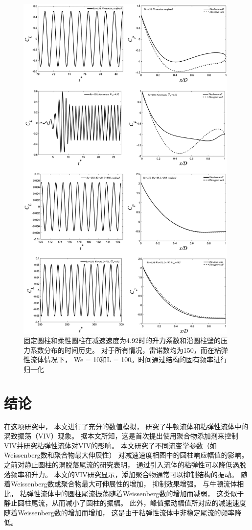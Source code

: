 \documentclass[UTF8,zihao=5]{ctexart} %
\begin{document}
\begin{figure}[htbp]
    \centering
    \includegraphics[width=11cm]{fig18.jpg}
    \caption{
        固定圆柱和柔性圆柱在减速速度为4.92时的升力系数和沿圆柱壁的压力系数分布的时间历史。
        对于所有情况，雷诺数均为150，而在粘弹性流体情况下，
        We = 10和L = 100。时间通过结构的固有频率进行归一化
    }
    \label{fig:18}
\end{figure}

\section{结论}

在这项研究中，
本文进行了充分的数值模拟，
研究了牛顿流体和粘弹性流体中的涡致振荡（VIV）现象。
据本文所知，这是首次提出使用聚合物添加剂来控制VIV并研究粘弹性流体对VIV的影响。
本文研究了不同流变学参数（如Weissenberg数和聚合物最大伸展性）
对减速速度相图中的圆柱响应幅值的影响。
之前对静止圆柱的涡脱落尾流的研究表明，
通过引入流体的粘弹性可以降低涡脱落频率和升力。
本文的VIV研究显示，添加聚合物通常可以抑制结构的振动。
随着Weissenberg数或聚合物最大可伸展性的增加，
抑制效果增强。
与牛顿流体相比，
粘弹性流体中的圆柱尾流振荡随着Weissenberg数的增加而减弱，
这类似于静止圆柱尾流，从而减小了圆柱的振幅。
此外，峰值振动幅值所对应的减速速度随着Weissenberg数的增加而增加，
这是由于粘弹性流体中非稳定尾流的频率降低。
\end{document}
